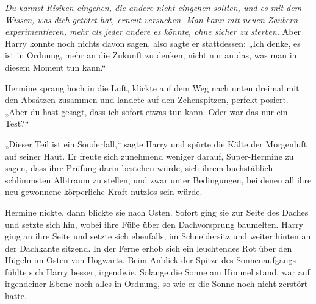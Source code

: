 \emph{Du kannst Risiken eingehen, die andere nicht eingehen sollten, und es mit dem Wissen, was dich getötet hat, erneut versuchen. Man kann mit neuen Zaubern experimentieren, mehr als jeder andere es könnte, ohne sicher zu sterben.}
Aber Harry konnte noch nichts davon sagen, also sagte er stattdessen: „Ich denke, es ist in Ordnung, mehr an die Zukunft zu denken, nicht nur an das, was man in diesem Moment tun kann.“

Hermine sprang hoch in die Luft, klickte auf dem Weg nach unten dreimal mit den Absätzen zusammen und landete auf den Zehenspitzen, perfekt posiert.
„Aber du hast gesagt, dass ich sofort etwas tun kann. Oder war das nur ein Test?“

„Dieser Teil ist ein Sonderfall,“ sagte Harry und spürte die Kälte der Morgenluft auf seiner Haut.
Er freute sich zunehmend weniger darauf, Super-Hermine zu sagen, dass ihre Prüfung darin bestehen würde, sich ihrem buchstäblich schlimmsten Albtraum zu stellen, und zwar unter Bedingungen, bei denen all ihre neu gewonnene körperliche Kraft nutzlos sein würde.

Hermine nickte, dann blickte sie nach Osten. Sofort ging sie zur Seite des Daches und setzte sich hin, wobei ihre Füße über den Dachvorsprung baumelten. Harry ging an ihre Seite und setzte sich ebenfalls, im Schneidersitz und weiter hinten an der Dachkante sitzend.
In der Ferne erhob sich ein leuchtendes Rot über den Hügeln im Osten von Hogwarts.
Beim Anblick der Spitze des Sonnenaufgangs fühlte sich Harry besser, irgendwie. Solange die Sonne am Himmel stand, war auf irgendeiner Ebene noch alles in Ordnung, so wie er die Sonne noch nicht zerstört hatte.

